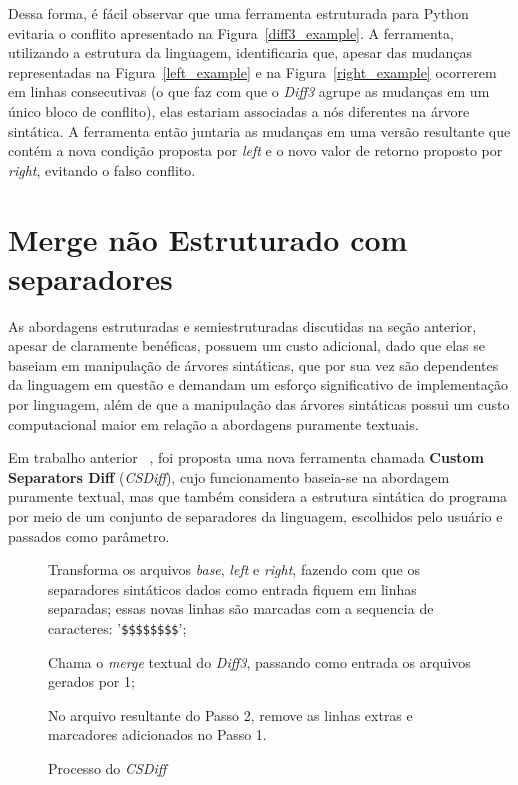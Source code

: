 Dessa forma, é fácil observar que uma ferramenta estruturada para Python evitaria o
conflito apresentado na Figura~\ref{diff3_example}. A ferramenta, utilizando a estrutura da
linguagem, identificaria que, apesar das mudanças representadas na Figura~\ref{left_example} e na
Figura~\ref{right_example} ocorrerem em linhas consecutivas (o que faz com que o \emph{Diff3}
agrupe as mudanças em um único bloco de conflito),
elas estariam associadas a nós diferentes na árvore
sintática. A ferramenta então juntaria as mudanças em uma versão resultante que contém a
nova condição proposta por \emph{left} e o novo valor de retorno proposto por \emph{right},
evitando o falso conflito.

\section{Merge não Estruturado com separadores}
As abordagens estruturadas e semiestruturadas discutidas na seção anterior, apesar de claramente benéficas,
possuem um custo adicional, dado que elas se baseiam em manipulação de árvores sintáticas, que por sua vez são
dependentes da linguagem em questão e demandam um esforço significativo de implementação por linguagem, além de que
a manipulação das árvores sintáticas possui um custo computacional maior em relação a abordagens puramente textuais.

Em trabalho anterior ~\cite{clem21}, foi proposta uma nova ferramenta chamada
\textbf{Custom Separators Diff} (\emph{CSDiff}), cujo funcionamento baseia-se na abordagem puramente textual, mas que também
considera a estrutura sintática do programa por meio de um conjunto de separadores da linguagem, escolhidos pelo usuário e
passados como parâmetro.

\begin{figure}[ht]
	\begin{center}
		\begin{compactenum}[(1)]
			\item Transforma os arquivos \emph{base}, \emph{left} e \emph{right}, fazendo com que os separadores sintáticos
			dados como entrada fiquem em linhas separadas; essas novas linhas são marcadas com a sequencia de caracteres:
			'\verb|$$$$$$$$|';
			\item Chama o \emph{merge} textual do \emph{Diff3}, passando como entrada os arquivos gerados por 1;
			\item No arquivo resultante do Passo 2, remove as linhas extras e marcadores adicionados no Passo 1.
		\end{compactenum}
	\end{center}
	\caption{Processo do \emph{CSDiff}}\label{csdiff_process}
\end{figure}


